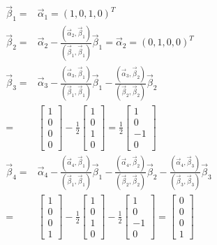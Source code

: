 \documentclass[a4paper]{book}
\begin{document}
\begin{align*}
\vec{\beta}_1=&\vec{\alpha}_1=(1,0,1,0)^T\\
\vec{\beta}_2=&\vec{\alpha}_2-\frac{(\vec{\alpha}_2,\vec{\beta}_1)}{(\vec{\beta}_1,\vec{\beta}_1)}\vec{\beta}_1
             =\vec{\alpha}_2=(0,1,0,0)^T\\
\vec{\beta}_3=&\vec{\alpha}_3-\frac{(\vec{\alpha}_3,\vec{\beta}_1)}{(\vec{\beta}_1,\vec{\beta}_1)}\vec{\beta}_1-
              \frac{(\vec{\alpha}_3,\vec{\beta}_2)}{(\vec{\beta}_2,\vec{\beta}_2)}\vec{\beta}_2\\
             =&\begin{bmatrix}1\\0\\0\\0\end{bmatrix}-\frac{1}{2}\begin{bmatrix}1\\0\\1\\0\end{bmatrix}
             =\frac{1}{2}\begin{bmatrix}1\\0\\-1\\0\end{bmatrix}\\
\vec{\beta}_4=&\vec{\alpha}_4-\frac{(\vec{\alpha}_4,\vec{\beta}_1)}{(\vec{\beta}_1,\vec{\beta}_1)}\vec{\beta}_1-
               \frac{(\vec{\alpha}_4,\vec{\beta}_2)}{(\vec{\beta}_2,\vec{\beta}_2)}\vec{\beta}_2
                -\frac{(\vec{\alpha}_4,\vec{\beta}_3)}{(\vec{\beta}_3,\vec{\beta}_3)}\vec{\beta}_3\\
             =&\begin{bmatrix}1\\0\\0\\1\end{bmatrix}-\frac{1}{2}\begin{bmatrix}1\\0\\1\\0\end{bmatrix}-
                \frac{1}{2}\begin{bmatrix}1\\0\\-1\\0\end{bmatrix}
              =\begin{bmatrix}0\\0\\0\\1\end{bmatrix}
\end{align*}
\end{document}
